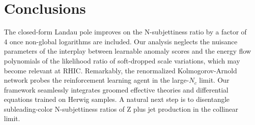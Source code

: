 \section{Conclusions}\label{sec:conclusions}

The closed-form Landau pole improves on the N-subjettiness ratio by a
factor of 4 once non-global logarithms are included. Our analysis
neglects the nuisance parameters of the interplay between learnable
anomaly scores and the energy flow polynomials of the likelihood ratio
of soft-dropped scale variations, which may become relevant at RHIC.
Remarkably, the renormalized Kolmogorov-Arnold network probes the
reinforcement learning agent in the large-$N_c$ limit. Our framework
seamlessly integrates groomed effective theories and differential
equations trained on Herwig samples. A natural next step is to
disentangle subleading-color N-subjettiness ratios of Z plus jet
production in the collinear limit.

